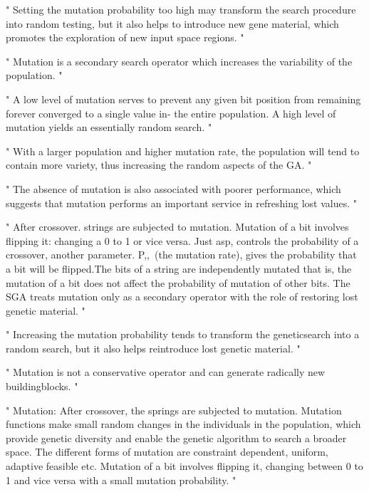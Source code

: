 "
Setting the mutation probability too high may transform the search procedure into random testing, but it also helps to introduce new gene material, which promotes the exploration of new input space regions.
"\cite{klampfl_using_nodate}



"
Mutation is a secondary search operator which increases the variability of the population.
"\cite{grefenstette_optimization_1986}

"
A low level of mutation serves to prevent any given bit position from remaining forever converged to a single value in- the entire population. A high level of mutation yields an essentially random search.
"\cite{grefenstette_optimization_1986}

"
With a larger population and higher mutation rate, the population will tend to contain more variety, thus increasing the random aspects of the GA.
"\cite{grefenstette_optimization_1986}

"
The absence of mutation is also associated with poorer performance, which suggests that mutation performs an important service in refreshing lost values.
"\cite{grefenstette_optimization_1986}

"
After crossover. strings are subjected to mutation. Mutation of a bit involves flipping it: changing a 0 to 1 or vice versa. Just asp, controls the probability of a crossover, another parameter. P,,~(the mutation rate), gives the probability that a bit will be flipped.The bits of a string are independently mutated that is, the mutation of a bit does not affect the probability of mutation of other bits. The SGA treats mutation only as a secondary operator with the role of restoring lost genetic material.
"\cite{srinivas_genetic_1994}

"
Increasing the mutation probability tends to transform the geneticsearch into a random search, but it also helps reintroduce lost genetic material.
"\cite{srinivas_genetic_1994}

"
Mutation is not a conservative operator and can generate radically new buildingblocks.
"\cite{srinivas_genetic_1994}


"
Mutation: After crossover, the springs are subjected to mutation. Mutation functions make small random changes in the individuals in the population, which provide genetic diversity and enable the genetic algorithm to search a broader space. The different forms of mutation are constraint dependent, uniform, adaptive feasible etc. Mutation of a bit involves flipping it, changing between 0 to 1 and vice versa with a small mutation probability.
"\cite{majumdar_genetic_2015}

